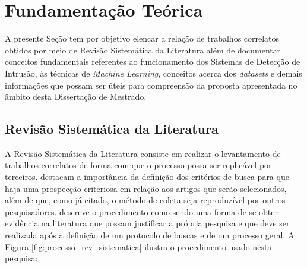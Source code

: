 


 

\chapter{Fundamentação Teórica}\label{cap_fundamentacao}

A presente Seção tem por objetivo elencar a relação de trabalhos correlatos obtidos por meio de Revisão Sistemática da Literatura além de documentar conceitos fundamentais referentes ao funcionamento dos Sistemas de Detecção de Intrusão, às técnicas de \textit{Machine Learning}, conceitos acerca dos \textit{datasets} e demais informações que possam ser úteis para compreensão da proposta apresentada no âmbito desta Dissertação de Mestrado.


\section{Revisão Sistemática da Literatura}
\label{rev_sistematica}

A Revisão Sistemática da Literatura consiste em realizar o levantamento de trabalhos correlatos de forma com que o processo possa ser replicável por terceiros.  destacam a importância da definição dos critérios de busca para que haja uma prospecção criteriosa em relação aos artigos que serão selecionados, além de que, como já citado, o método de coleta seja reproduzível por outros pesquisadores.  descreve o procedimento como sendo uma forma de se obter evidência na literatura que possam justificar a própria pesquisa e que deve ser realizada após a definição de um protocolo de buscas e de um processo geral. A Figura \ref{fig:processo_rev_sistematica} ilustra o procedimento usado nesta pesquisa:

